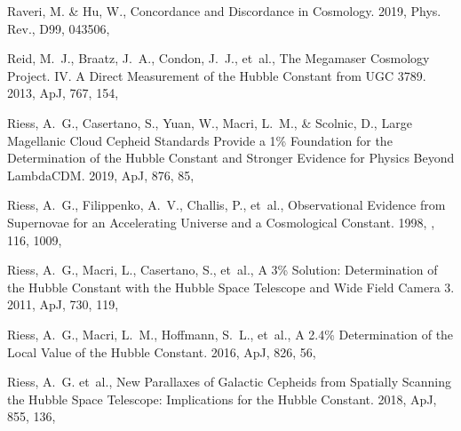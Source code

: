 \documentclass[longauth,traditabstract]{aa}
\def\apj{{ApJ}}
\begin{document}
\begin{thebibliography}{379}
Raveri, M. \& Hu, W., {Concordance and Discordance in Cosmology}. 2019, Phys.
  Rev., D99, 043506, 

{Reid}, M.~J., {Braatz}, J.~A., {Condon}, J.~J., {et~al.}, {The Megamaser
  Cosmology Project. IV. A Direct Measurement of the Hubble Constant from UGC
  3789}. 2013, \apj, 767, 154, 

Riess, A.~G., Casertano, S., Yuan, W., Macri, L.~M., \& Scolnic, D., {Large
  Magellanic Cloud Cepheid Standards Provide a 1\% Foundation for the
  Determination of the Hubble Constant and Stronger Evidence for Physics Beyond
  LambdaCDM}. 2019, \apj, 876, 85, 

{Riess}, A.~G., {Filippenko}, A.~V., {Challis}, P., {et~al.}, {Observational
  Evidence from Supernovae for an Accelerating Universe and a Cosmological
  Constant}. 1998, \aj, 116, 1009, 

Riess, A.~G., Macri, L., Casertano, S., {et~al.}, {A 3\% Solution:
  Determination of the Hubble Constant with the Hubble Space Telescope and Wide
  Field Camera 3}. 2011, \apj, 730, 119, 

{Riess}, A.~G., {Macri}, L.~M., {Hoffmann}, S.~L., {et~al.}, {A 2.4\%
  Determination of the Local Value of the Hubble Constant}. 2016, \apj, 826,
  56, 

Riess, A.~G. {et~al.}, {\providecommand{\mockalph}[1]{}\mockalph{a}New
  Parallaxes of Galactic Cepheids from Spatially Scanning the Hubble Space
  Telescope: Implications for the Hubble Constant}. 2018{}, \apj,
  855, 136, 


\end{thebibliography}
\end{document}
